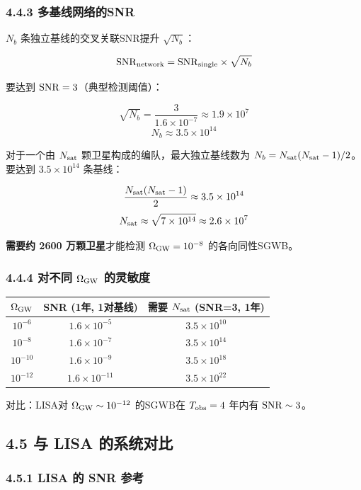 \documentclass[12pt,a4paper]{article}
\begin{document}
\subsubsection{4.4.3 多基线网络的SNR}


$N_b$ 条独立基线的交叉关联SNR提升 $\sqrt{N_b}$：

$${\rm SNR}_{\rm network} = {\rm SNR}_{\rm single} \times \sqrt{N_b}$$

要达到 ${\rm SNR} = 3$（典型检测阈值）：

$$\sqrt{N_b} = \frac{3}{1.6 \times 10^{-7}} \approx 1.9 \times 10^7$$
$$N_b \approx 3.5 \times 10^{14}$$

对于一个由 $N_{\rm sat}$ 颗卫星构成的编队，最大独立基线数为 $N_b = N_{\rm sat}(N_{\rm sat}-1)/2$。要达到 $3.5 \times 10^{14}$ 条基线：

$$\frac{N_{\rm sat}(N_{\rm sat}-1)}{2} \approx 3.5 \times 10^{14}$$
$$N_{\rm sat} \approx \sqrt{7 \times 10^{14}} \approx 2.6 \times 10^7$$

\textbf{需要约 2600 万颗卫星}才能检测 $\Omega_{\rm GW} = 10^{-8}$ 的各向同性SGWB。

\subsubsection{4.4.4 对不同 $\Omega_{\rm GW}$ 的灵敏度}


\begin{tabular}{|c|c|c|}
\hline
$\Omega_{\rm GW}$ & SNR (1年, 1对基线) & 需要 $N_{\rm sat}$ (SNR=3, 1年) \\
\hline
$10^{-6}$ & $1.6 \times 10^{-5}$ & $3.5 \times 10^{10}$ \\
$10^{-8}$ & $1.6 \times 10^{-7}$ & $3.5 \times 10^{14}$ \\
$10^{-10}$ & $1.6 \times 10^{-9}$ & $3.5 \times 10^{18}$ \\
$10^{-12}$ & $1.6 \times 10^{-11}$ & $3.5 \times 10^{22}$ \\
\hline
\end{tabular}


对比：LISA对 $\Omega_{\rm GW} \sim 10^{-12}$ 的SGWB在 $T_{\rm obs} = 4$ 年内有 ${\rm SNR} \sim 3$。

\subsection{4.5 与 LISA 的系统对比}


\subsubsection{4.5.1 LISA 的 SNR 参考}
\end{document}
